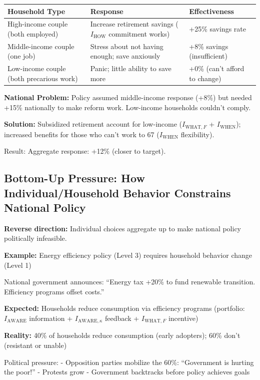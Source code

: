 \begin{center}
\begin{tabular}{@{}lll@{}}
\toprule
\textbf{Household Type} & \textbf{Response} & \textbf{Effectiveness} \\
\midrule
High-income couple (both employed) & Increase retirement savings ($I_{\text{HOW}}$ commitment works) & +25\% savings rate \\
Middle-income couple (one job) & Stress about not having enough; save anxiously & +8\% savings (insufficient) \\
Low-income couple (both precarious work) & Panic; little ability to save more & +0\% (can't afford to change) \\
\midrule
\end{tabular}
\end{center}

\textbf{National Problem:} Policy assumed middle-income response (+8\%) but needed +15\% nationally to make reform work. Low-income households couldn't comply.

\textbf{Solution:} Subsidized retirement account for low-income ($I_{\text{WHAT},F}$ + $I_{\text{WHEN}}$); increased benefits for those who can't work to 67 ($I_{\text{WHEN}}$ flexibility).

Result: Aggregate response: +12\% (closer to target).

\subsection{Bottom-Up Pressure: How Individual/Household Behavior Constrains National Policy}

\textbf{Reverse direction:} Individual choices aggregate up to make national policy politically infeasible.

\textbf{Example:} Energy efficiency policy (Level 3) requires household behavior change (Level 1)

National government announces: ``Energy tax +20\% to fund renewable transition. Efficiency programs offset costs.''

\textbf{Expected:} Households reduce consumption via efficiency programs (portfolio: $I_{\text{AWARE}}$ information + $I_{\text{AWARE},\kappa}$ feedback + $I_{\text{WHAT},F}$ incentive)

\textbf{Reality:} 40\% of households reduce consumption (early adopters); 60\% don't (resistant or unable)

Political pressure:
- Opposition parties mobilize the 60\%: ``Government is hurting the poor!''
- Protests grow
- Government backtracks before policy achieves goals

